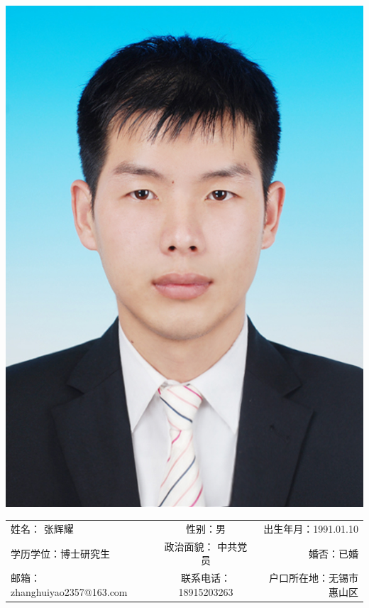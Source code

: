 
\begin{minipage}{0.2\textwidth}
	\includegraphics[scale=1.1]{8574.png}
\end{minipage}
\hfill
\begin{minipage}{0.8\textwidth}
	\renewcommand{\arraystretch}{2.2}
	\begin{adjustbox}{width=1\linewidth}
		\begin{tabular}{lcr}
			姓名： 张辉耀 & 性别：男 & 出生年月：1991.01.10 \\
			学历学位：博士研究生 & 政治面貌： 中共党员 & 婚否：已婚 \\
			邮箱： zhanghuiyao2357@163.com & 联系电话：18915203263 &
			户口所在地：无锡市惠山区\\
		\end{tabular}
	\renewcommand{\arraystretch}{0.5}
	\end{adjustbox}
\end{minipage}
